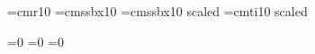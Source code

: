 
\font\mainfont=cmr10
\font\chheadfont=cmssbx10
\font\bkheadfont=cmssbx10 scaled 
\font\titlefont=cmti10 scaled 

=0
=0
=0

\def\ejtoodd#1{\ifodd\count0\null\break\eject\null\break\eject\else\null\break\eject\fi}

\def\title#1{\centerline{\titlefont #1}\vskip 26pt \centerline{\bkheadfont \versionname}\eject}

\def\version#1{\def\versionname{The #1 Version}}

\def\testament#1{\ejtoodd{}\rightline{\titlefont The #1 Testament}\eject\count12=0}

\def\book#1{}

\def\chapter#1{}

\def\verse{}

